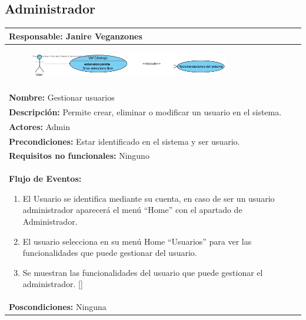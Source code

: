 \documentclass{report}
\begin{document}
        \subsection{Administrador}
        \begin{center}
            \begin{longtable}{|p{\linewidth}|}
                \hline
                \textbf{Responsable:} Janire Veganzones\\
                \hline
                \begin{figure}[H]
                    \centering
                    \includegraphics[width=0.8\textwidth]{./img/casos_uso/RecomendacionesDelSistema.jpg}
                \end{figure}\\
                \hline
                \textbf{Nombre:} Gestionar usuarios\\
                \hline
                \textbf{Descripción:}  Permite crear, eliminar o modificar un usuario en el sistema.\\
                \hline
                \textbf{Actores:} Admin\\
                \hline
                \textbf{Precondiciones:} Estar identificado en el sistema y ser usuario.\\
                \hline
                \textbf{Requisitos no funcionales:} Ninguno\\
                \hline
                \textbf{Flujo de Eventos:}
                \begin{enumerate}
                    \item El Usuario se identifica mediante su cuenta, en caso de ser un usuario administrador aparecerá el menú “Home” con el apartado de Administrador.
                    \item El usuario selecciona en su menú Home “Usuarios” para ver las funcionalidades que puede gestionar del usuario.
                    \item Se muestran las funcionalidades del usuario que puede gestionar el administrador.  
                    []
                \end{enumerate}\\
                \hline
                \textbf{Poscondiciones:} Ninguna\\
                \hline

\end{longtable}
\end{center}
\end{document}
